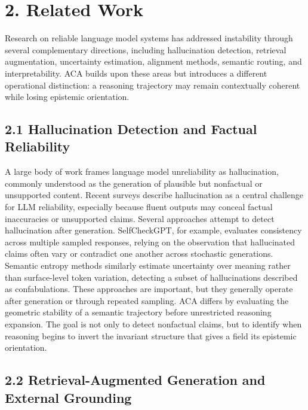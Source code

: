 \documentclass[11pt]{article}
\begin{document}
\section{2. Related Work}

Research on reliable language model systems has addressed instability through several complementary directions, including hallucination detection, retrieval augmentation, uncertainty estimation, alignment methods, semantic routing, and interpretability. ACA builds upon these areas but introduces a different operational distinction: a reasoning trajectory may remain contextually coherent while losing epistemic orientation.

\subsection{2.1 Hallucination Detection and Factual Reliability}

A large body of work frames language model unreliability as hallucination, commonly understood as the generation of plausible but nonfactual or unsupported content. Recent surveys describe hallucination as a central challenge for LLM reliability, especially because fluent outputs may conceal factual inaccuracies or unsupported claims. Several approaches attempt to detect hallucination after generation. SelfCheckGPT, for example, evaluates consistency across multiple sampled responses, relying on the observation that hallucinated claims often vary or contradict one another across stochastic generations. Semantic entropy methods similarly estimate uncertainty over meaning rather than surface-level token variation, detecting a subset of hallucinations described as confabulations. These approaches are important, but they generally operate after generation or through repeated sampling. ACA differs by evaluating the geometric stability of a semantic trajectory before unrestricted reasoning expansion. The goal is not only to detect nonfactual claims, but to identify when reasoning begins to invert the invariant structure that gives a field its epistemic orientation.

\subsection{2.2 Retrieval-Augmented Generation and External Grounding}
\end{document}
